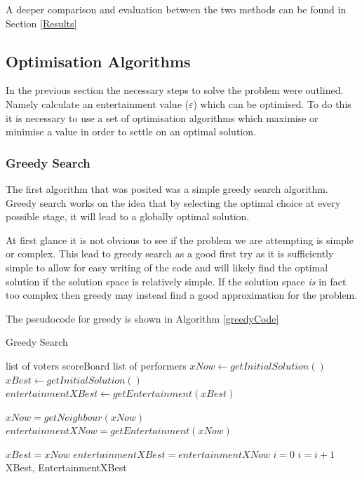 \documentclass[12pt]{report}
\begin{document}
A deeper comparison and evaluation between the two methods can be found in Section \ref{Results}

\subsection{Optimisation Algorithms}\label{Algorithms}
In the previous section the necessary steps to solve the problem were outlined. Namely calculate an entertainment value ($\varepsilon$) which can be optimised. To do this it is necessary to use a set of optimisation algorithms which maximise or minimise a value in order to settle on an optimal solution.

\subsubsection{Greedy Search}
The first algorithm that was posited was a simple greedy search algorithm. Greedy search works on the idea that by selecting the optimal choice at every possible stage, it will lead to a globally optimal solution. 

At first glance it is not obvious to see if the problem we are attempting is simple or complex. This lead to greedy search as a good first try as it is sufficiently simple to allow for easy writing of the code and will likely find the optimal solution if the solution space is relatively simple. If the solution space \textit{is} in fact too complex then greedy may instead find a good approximation for the problem.

The pseudocode for greedy is shown in Algorithm \ref{greedyCode}

\begin{algorithm}
\caption{Greedy Search}
\label{greedyCode}
\begin{algorithmic}[1]
\REQUIRE list of voters
\REQUIRE scoreBoard
\REQUIRE list of performers
\STATE $xNow \leftarrow getInitialSolution()$
\STATE $xBest \leftarrow getInitialSolution()$
\STATE $entertainmentXBest \leftarrow getEntertainment(xBest)$

\STATE $xNow = getNeighbour(xNow)$
\STATE $entertainmentXNow = getEntertainment(xNow)$

\STATE $xBest = xNow$
\STATE $entertainmentXBest = entertainmentXNow$
\STATE $i = 0$
\ENDIF
\STATE $i = i + 1$
\ENDWHILE
\RETURN XBest, EntertainmentXBest
\end{algorithmic}
\end{algorithm}
\end{document}
